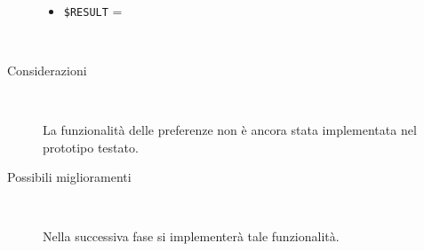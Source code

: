 \documentclass[../../Sperimentazione.tex]{subfiles}
\begin{document}
\begin{tcolorbox}[fonttitle=\bfseries, 
								adjusted title={\Large Prova 2B.1}, 
								breakable, 
								sharp corners=south,
								colback=white, 
								colframe=white!60!black]
\begin{description}[leftmargin=0.7cm,labelwidth=!]
\begin{description}
        					\item[\dispositivoB] \ \par
        					\begin{itemize}
        						\item \verb|$RESULT| = \ns
        					\end{itemize}
        					
        				\end{description}
        				
        			\tcbline
        			
        			\item[Analisi risultati] \ \par
        				\begin{description}
        					\item[Considerazioni] \ \par
        						La funzionalità delle preferenze non è ancora stata implementata nel prototipo testato.
        					
        					\item[Possibili miglioramenti] \ \par 
        						Nella successiva fase si implementerà tale funzionalità.
        				\end{description}
        				
				\end{description}  
				
			\end{tcolorbox}



	
	\newpage
\end{document}
